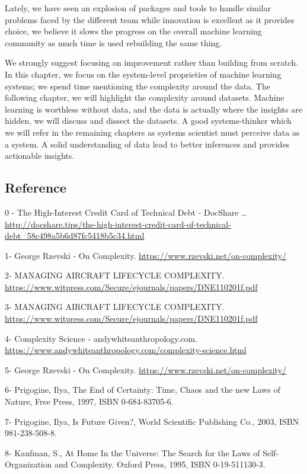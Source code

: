 \documentclass[]{article}
\begin{document}
Lately, we have seen an explosion of packages and tools to handle
similar problems faced by the different team while innovation is
excellent as it provides choice, we believe it slows the progress on the
overall machine learning community as much time is used rebuilding the
same thing.

We strongly suggest focusing on improvement rather than building from
scratch. In this chapter, we focus on the system-level proprieties of
machine learning systems; we spend time mentioning the complexity around
the data. The following chapter, we will highlight the complexity around
datasets. Machine learning is worthless without data, and the data is
actually where the insights are hidden, we will discuss and dissect the
datasets. A good systems-thinker which we will refer in the remaining
chapters as systems scientist must perceive data as a system. A solid
understanding of data lead to better inferences and provides actionable
insights.

\subsection{Reference}\label{reference}

0 - The High-Interest Credit Card of Technical Debt - DocShare \ldots{}
\url{http://docshare.tips/the-high-interest-credit-card-of-technical-debt_58c498a5b6d87fc5418b5c34.html}

1- George Rzevski - On Complexity.
\url{https://www.rzevski.net/on-complexity/}

2- MANAGING AIRCRAFT LIFECYCLE COMPLEXITY.
\url{https://www.witpress.com/Secure/ejournals/papers/DNE110201f.pdf}

3- MANAGING AIRCRAFT LIFECYCLE COMPLEXITY.
\url{https://www.witpress.com/Secure/ejournals/papers/DNE110201f.pdf}

4- Complexity Science - andywhiteanthropology.com.
\url{https://www.andywhiteanthropology.com/complexity-science.html}

5- George Rzevski - On Complexity.
\url{https://www.rzevski.net/on-complexity/}

6- Prigogine, Ilya, The End of Certainty: Time, Chaos and the new Laws
of Nature, Free Press, 1997, ISBN 0-684-83705-6.

7- Prigogine, Ilya, Is Future Given?, World Scientific Publishing Co.,
2003, ISBN 981-238-508-8.

8- Kaufman, S., At Home In the Universe: The Search for the Laws of
Self-Organization and Complexity. Oxford Press, 1995, ISBN
0-19-511130-3.
\end{document}
